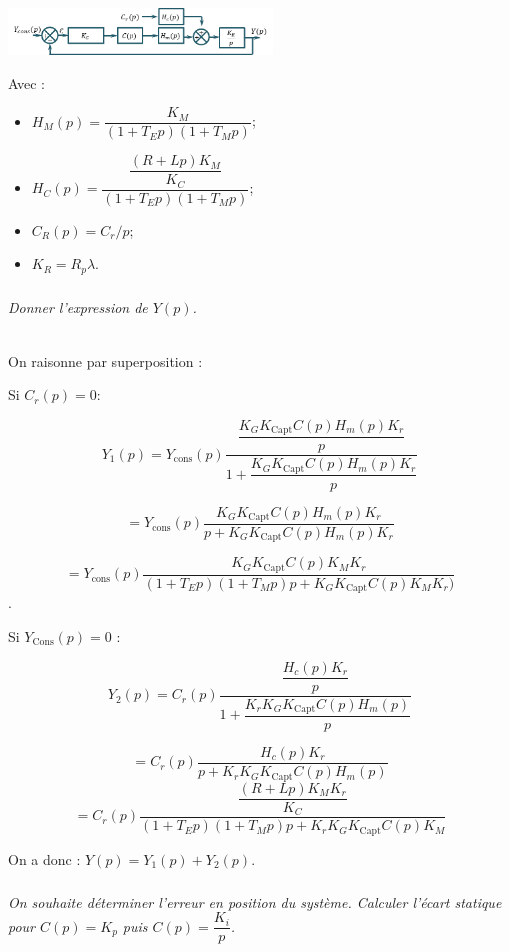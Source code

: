 \documentclass[10pt,fleqn]{article} %
\begin{document}
\begin{multicols}{2}
 \begin{center}
\includegraphics[width=7cm]{images/image10}
\end{center} 


Avec :
\begin{itemize}
\item $H_M (p)=\dfrac{K_M}{(1+T_E p)(1+T_M p)}$;
\item $H_C (p)=\dfrac{\dfrac{\left(R+Lp\right)K_M}{K_C}}{(1+T_E p)(1+T_M p)}$;
\item $C_R (p)=C_r/p$;
\item $K_R=R_p \lambda$.
\end{itemize}
\fi

\subparagraph{}
\textit{Donner l'expression de $Y(p)$.}
\ifprof
\begin{corrige}~\\
On raisonne par superposition :

Si $C_r (p)=0$: 

$$Y_1 (p)
=Y_{\text{cons}}(p) \dfrac{\dfrac{K_G K_{\text{Capt}} C(p) H_m (p) K_r}{p}}{1+\dfrac{K_G K_{\text{Capt}} C(p) H_m (p) K_r}{p}}$$

$$
=Y_{\text{cons}} (p) \dfrac{K_G K_{\text{Capt}} C(p) H_m (p) K_r}{p+K_G K_{\text{Capt}} C(p) H_m (p) K_r } 
$$

$$
=Y_{\text{cons}} (p) \dfrac{K_G K_{\text{Capt}} C(p) K_M  K_r}{(1+T_E p)(1+T_M p)p+K_G K_{\text{Capt}} C(p) K_M K_r )}$$.

\end{corrige}

\begin{corrige}
Si $Y_{\text{Cons}} (p)=0$ :

$$Y_2 (p)
=C_r (p) \dfrac{\dfrac{H_c (p) K_r}{p}}{1+\dfrac{K_r K_G K_{\text{Capt}} C(p) H_m (p)}{p} }$$

$$
=C_r (p) \dfrac{H_c (p) K_r}{p+K_r K_G K_{\text{Capt}} C(p) H_m (p) }$$
$$
=C_r (p) \dfrac{\dfrac{(R+Lp) K_M  K_r}{K_C }}{(1+T_E p)(1+T_M p)p+K_r K_G K_{\text{Capt}} C(p) K_M }$$

On a donc :
$Y(p)=Y_1 (p)+Y_2 (p)$.

\end{corrige}
\else
\fi

\subparagraph{}
\textit{On souhaite déterminer l'erreur en position du système. Calculer l'écart statique pour $C(p)=K_p$ puis $C(p)=\dfrac{K_i}{p}$.}
\ifprof
\begin{corrige}
\end{corrige}
\else
\fi


\end{multicols}
\end{document}
